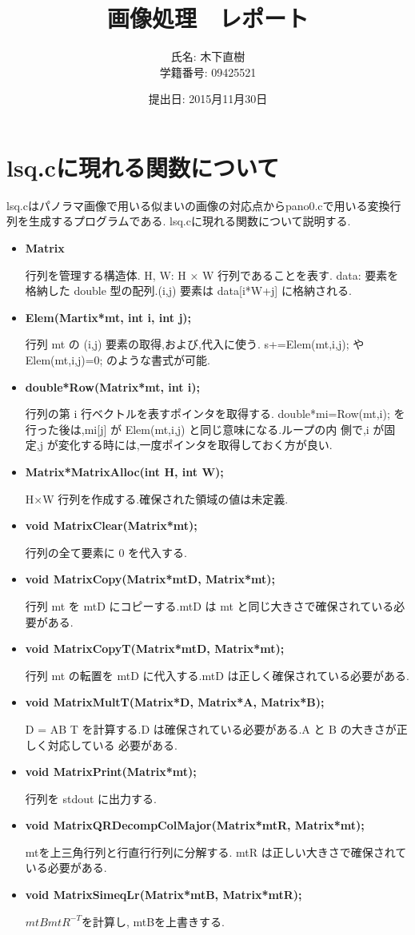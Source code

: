 \documentclass[a4j]{jarticle}
\title{画像処理　レポート}
\author{氏名: 木下直樹\\学籍番号: 09425521}
\date{提出日: 2015月11月30日}
\begin{document}
\maketitle

\section{lsq.cに現れる関数について}
lsq.cはパノラマ画像で用いる似まいの画像の対応点からpano0.cで用いる変換行列を生成するプログラムである. lsq.cに現れる関数について説明する.

\begin{itemize}

\item {\bf Matrix}

  行列を管理する構造体.
  H, W: H × W 行列であることを表す.
  data: 要素を格納した double 型の配列.(i,j) 要素は data[i*W+j] に格納される.
\item {\bf Elem(Martix*mt, int i, int j);}

  行列 mt の (i,j) 要素の取得,および,代入に使う.
  s+=Elem(mt,i,j); や Elem(mt,i,j)=0; のような書式が可能.
\item {\bf double*Row(Matrix*mt, int i);}

  行列の第 i 行ベクトルを表すポインタを取得する.
  double*mi=Row(mt,i); を行った後は,mi[j] が Elem(mt,i,j) と同じ意味になる.ループの内
  側で,i が固定,j が変化する時には,一度ポインタを取得しておく方が良い.
\item {\bf Matrix*MatrixAlloc(int H, int W);}

  H×W 行列を作成する.確保された領域の値は未定義.
\item {\bf void MatrixClear(Matrix*mt);}

  行列の全て要素に 0 を代入する.
\item {\bf void MatrixCopy(Matrix*mtD, Matrix*mt);}
  
  行列 mt を mtD にコピーする.mtD は mt と同じ大きさで確保されている必要がある.
\item {\bf void MatrixCopyT(Matrix*mtD, Matrix*mt);}

  行列 mt の転置を mtD に代入する.mtD は正しく確保されている必要がある.
\item {\bf void MatrixMultT(Matrix*D, Matrix*A, Matrix*B);}

  D = AB T を計算する.D は確保されている必要がある.A と B の大きさが正しく対応している
  必要がある.
\item {\bf void MatrixPrint(Matrix*mt);}

  行列を stdout に出力する.
\item {\bf void MatrixQRDecompColMajor(Matrix*mtR, Matrix*mt);}

  mtを上三角行列と行直行行列に分解する.
  mtR は正しい大きさで確保されている必要がある.
\item {\bf void MatrixSimeqLr(Matrix*mtB, Matrix*mtR);}
  
  $mtBmtR^{-T}$を計算し, mtBを上書きする.
\end{itemize}
\end{document}
